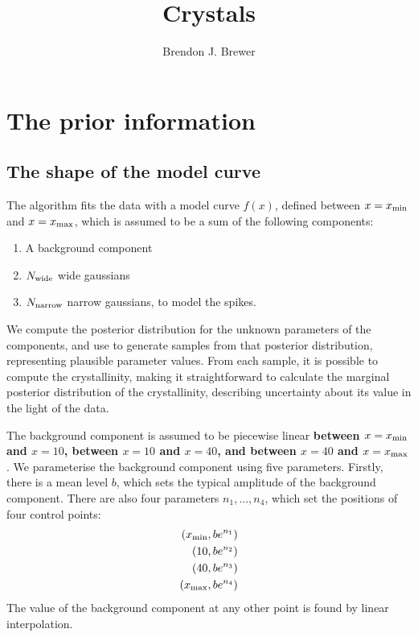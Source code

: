 \documentclass[a4paper, 12pt]{article}
\title{Crystals}
\author{Brendon J. Brewer}
\date{}
\newcommand{\x}{x}
\newcommand{\todo}{\color{orange} \bf}
\begin{document}
\maketitle


\setlength{\parindent}{0pt}
\setlength{\parskip}{8pt}

\section{The prior information}



\subsection{The shape of the model curve}
The algorithm fits the data with a model curve
$f(\x)$, defined between $\x=\x_{\rm min}$ and $\x=\x_{\rm max}$,
which is assumed to be a sum of the following components:
\begin{enumerate}
\item A background component
\item $N_{\rm wide}$ wide gaussians
\item $N_{\rm narrow}$ narrow gaussians, to model the spikes.
\end{enumerate}

We compute the posterior distribution for the unknown parameters of the
components, and use \citep{dnest4} to generate samples from that posterior
distribution, representing plausible parameter values. From each sample,
it is possible to compute the crystallinity, making it straightforward to
calculate the marginal posterior distribution of the crystallinity, describing
uncertainty about its value in the light of the data.


The background component is assumed to be piecewise linear
{\todo between $\x=x_{\rm min}$ and $\x=10$, between $\x=10$ and $\x=40$,
and between $\x=40$ and $\x=\x_{\rm max}$}.
We parameterise the background component using
five parameters. Firstly, there is a mean level $b$, which sets the
typical amplitude of the background component. There are also four parameters
$n_1, ..., n_4$, which set the positions of four control points:
\begin{align}
\left(\x_{\rm min}, be^{n_1}\right) \nonumber\\
\left(10, be^{n_2}\right) \nonumber\\
\left(40, be^{n_3}\right) \nonumber\\
\left(\x_{\rm max}, be^{n_4}\right) \nonumber
\end{align}
The value of the background component at any other point is found by
linear interpolation.
\end{document}
